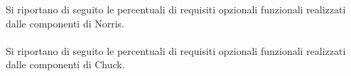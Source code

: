 				Si riportano di seguito le percentuali di requisiti opzionali funzionali realizzati dalle componenti di Norris.
				\\ \\ 

				Si riportano di seguito le percentuali di requisiti opzionali funzionali realizzati dalle componenti di Chuck.

